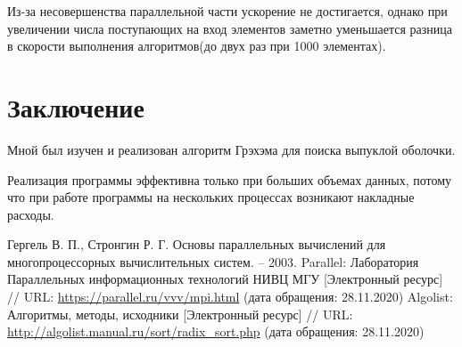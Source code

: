 \documentclass{report}
\begin{document}
Из-за несовершенства параллельной части ускорение не достигается, однако при увеличении числа поступающих на вход элементов заметно уменьшается разница в скорости выполнения алгоритмов(до двух раз при 1000 элементах).
\newpage


\section*{Заключение}
Мной был изучен и реализован алгоритм Грэхэма для поиска выпуклой оболочки.
\par 
Реализация программы эффективна только при больших объемах данных, потому что при работе программы на нескольких процессах возникают накладные расходы.
\newpage


\begin{thebibliography}{1}
Гергель В. П., Стронгин Р. Г. Основы параллельных вычислений для многопроцессорных вычислительных систем. – 2003.
 Parallel: Лаборатория Параллельных информационных технологий НИВЦ МГУ [Электронный ресурс] // URL: \url {https://parallel.ru/vvv/mpi.html} (дата обращения: 28.11.2020)
 Algolist: Алгоритмы, методы, исходники [Электронный ресурс] // URL: \url {http://algolist.manual.ru/sort/radix_sort.php} (дата обращения: 28.11.2020)
\end{thebibliography}
\newpage

\end{document}
